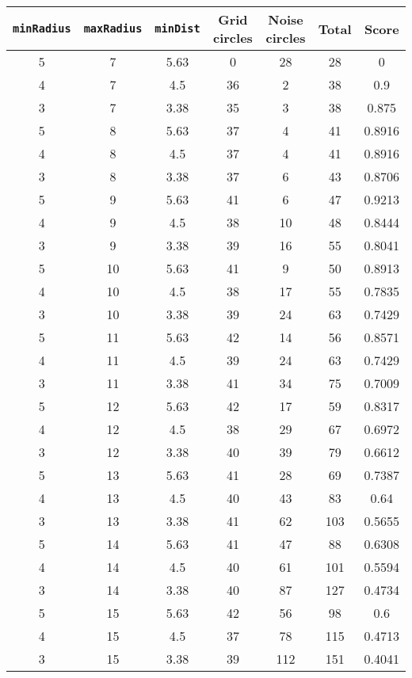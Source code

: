 \documentclass[letterpaper, 12pt]{article}
\begin{document}
\begin{longtable}{|c|c|c|c|c|c|c|}
\hline
\textbf{\texttt{minRadius}} & \textbf{\texttt{maxRadius}} & \textbf{\texttt{minDist}} & \textbf{Grid circles} & \textbf{Noise circles} & \textbf{Total} & \textbf{Score} \\
\hline
5 & 7 & 5.63 & 0 & 28 & 28 & 0 \\
\hline
4 & 7 & 4.5 & 36 & 2 & 38 & 0.9 \\
\hline
3 & 7 & 3.38 & 35 & 3 & 38 & 0.875 \\
\hline
5 & 8 & 5.63 & 37 & 4 & 41 & 0.8916 \\
\hline
4 & 8 & 4.5 & 37 & 4 & 41 & 0.8916 \\
\hline
3 & 8 & 3.38 & 37 & 6 & 43 & 0.8706 \\
\hline
5 & 9 & 5.63 & 41 & 6 & 47 & 0.9213 \\
\hline
4 & 9 & 4.5 & 38 & 10 & 48 & 0.8444 \\
\hline
3 & 9 & 3.38 & 39 & 16 & 55 & 0.8041 \\
\hline
5 & 10 & 5.63 & 41 & 9 & 50 & 0.8913 \\
\hline
4 & 10 & 4.5 & 38 & 17 & 55 & 0.7835 \\
\hline
3 & 10 & 3.38 & 39 & 24 & 63 & 0.7429 \\
\hline
5 & 11 & 5.63 & 42 & 14 & 56 & 0.8571 \\
\hline
4 & 11 & 4.5 & 39 & 24 & 63 & 0.7429 \\
\hline
3 & 11 & 3.38 & 41 & 34 & 75 & 0.7009 \\
\hline
5 & 12 & 5.63 & 42 & 17 & 59 & 0.8317 \\
\hline
4 & 12 & 4.5 & 38 & 29 & 67 & 0.6972 \\
\hline
3 & 12 & 3.38 & 40 & 39 & 79 & 0.6612 \\
\hline
5 & 13 & 5.63 & 41 & 28 & 69 & 0.7387 \\
\hline
4 & 13 & 4.5 & 40 & 43 & 83 & 0.64 \\
\hline
3 & 13 & 3.38 & 41 & 62 & 103 & 0.5655 \\
\hline
5 & 14 & 5.63 & 41 & 47 & 88 & 0.6308 \\
\hline
4 & 14 & 4.5 & 40 & 61 & 101 & 0.5594 \\
\hline
3 & 14 & 3.38 & 40 & 87 & 127 & 0.4734 \\
\hline
5 & 15 & 5.63 & 42 & 56 & 98 & 0.6 \\
\hline
4 & 15 & 4.5 & 37 & 78 & 115 & 0.4713 \\
\hline
3 & 15 & 3.38 & 39 & 112 & 151 & 0.4041 \\

\end{longtable}
\end{document}
